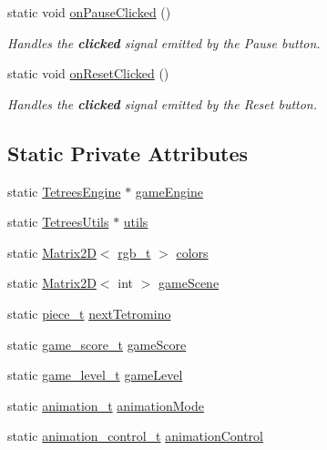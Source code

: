 \begin{DoxyCompactItemize}
static void \hyperlink{classTetreesUI_ae821c638a19a77e9a64e9334b8011cba}{on\+Pause\+Clicked} ()
\begin{DoxyCompactList}\small\item\em Handles the {\bfseries clicked} signal emitted by the Pause button. \end{DoxyCompactList}\item 
static void \hyperlink{classTetreesUI_a587ff52a2c843c4d331f329f4b94ddbd}{on\+Reset\+Clicked} ()
\begin{DoxyCompactList}\small\item\em Handles the {\bfseries clicked} signal emitted by the Reset button. \end{DoxyCompactList}\end{DoxyCompactItemize}
\subsection*{Static Private Attributes}
\begin{DoxyCompactItemize}
\item 
static \hyperlink{classTetreesEngine}{Tetrees\+Engine} $\ast$ \hyperlink{classTetreesUI_a07faa56ea40b28beba7509fa7f65c897}{game\+Engine}
\item 
static \hyperlink{classTetreesUtils}{Tetrees\+Utils} $\ast$ \hyperlink{classTetreesUI_a80545840b2848938d01d7f85786ee141}{utils}
\item 
static \hyperlink{classMatrix2D}{Matrix2D}$<$ \hyperlink{structrgb__t}{rgb\+\_\+t} $>$ \hyperlink{classTetreesUI_a57300c1925cb5ae34c9220cd993e28b2}{colors}
\item 
static \hyperlink{classMatrix2D}{Matrix2D}$<$ int $>$ \hyperlink{classTetreesUI_a604cf4cecdbc93745eaf7733b3c33602}{game\+Scene}
\item 
static \hyperlink{structpiece__t}{piece\+\_\+t} \hyperlink{classTetreesUI_a6296ce8f3cde853cec110718c4b88540}{next\+Tetromino}
\item 
static \hyperlink{structgame__score__t}{game\+\_\+score\+\_\+t} \hyperlink{classTetreesUI_a128491041c6b77acec829fb5b1f4dafb}{game\+Score}
\item 
static \hyperlink{structgame__level__t}{game\+\_\+level\+\_\+t} \hyperlink{classTetreesUI_a700b75dbee9c324c69a18f34c5efdab9}{game\+Level}
\item 
static \hyperlink{TetreesDefs_8hpp_a10487f3bfa31fd7b7b8c20f403f8c947}{animation\+\_\+t} \hyperlink{classTetreesUI_af3bd9b55da30d2b324c2dfe2d740d8a2}{animation\+Mode}
\item 
static \hyperlink{structanimation__control__t}{animation\+\_\+control\+\_\+t} \hyperlink{classTetreesUI_a06df6e44abd5d521448cf1299433b55c}{animation\+Control}
\end{DoxyCompactItemize}


